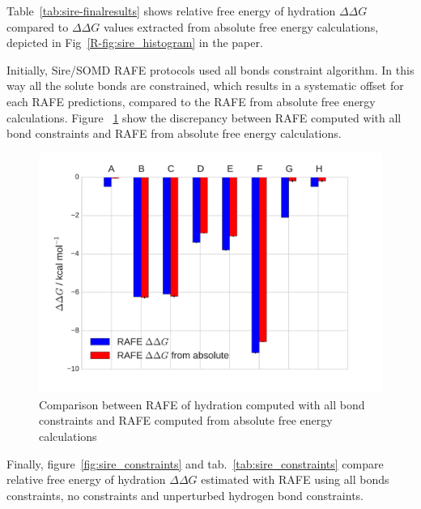 \documentclass[journal=jctcce,manuscript=suppinfo]{achemso}
\begin{document}
Table~\ref{tab:sire-finalresults} shows relative free energy of hydration $\Delta\Delta G$ compared to $\Delta\Delta G$ values extracted from absolute free energy calculations, depicted in Fig~\ref{R-fig:sire_histogram} in the paper.

Initially, Sire/SOMD RAFE protocols used all bonds constraint algorithm. In this way all the solute bonds are constrained, which results in a
systematic offset for each RAFE predictions, compared to the RAFE from absolute free energy calculations.
Figure ~\ref{fig:sire_allbonds} show the discrepancy between RAFE computed with all bond constraints and RAFE from absolute free energy calculations.


\begin{figure}[ht]
  \includegraphics[width=\textwidth]{figures/SI_sire_allbonds_relabs.pdf}
  \caption{Comparison between RAFE of hydration computed with all bond constraints and RAFE computed from absolute free energy calculations}
  \label{fig:sire_allbonds}
\end{figure}

Finally, figure~\ref{fig:sire_constraints} and tab.~\ref{tab:sire_constraints} compare relative free energy of hydration $\Delta \Delta G$ estimated with RAFE using all bonds constraints, no constraints and unperturbed hydrogen bond constraints.
\end{document}
